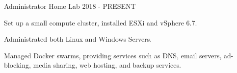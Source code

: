 

\begin{cventries}

  \cventry
    {Administrator} %
    {Home Lab} %
    {} %
    {2018 - PRESENT} %
    {
      \begin{cvitems} %
        \item {Set up a small compute cluster, installed ESXi and vSphere 6.7.}
        \item {Administrated both Linux and Windows Servers.}
        \item {Managed Docker swarms, providing services such as DNS, email servers, ad-blocking, media sharing, web hosting, and backup services.}
      \end{cvitems}
    }
    
  


\end{cventries}
